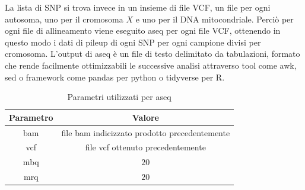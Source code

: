  La lista di SNP si trova invece in un insieme di file VCF, un file per ogni autosoma, uno per il cromosoma $X$ e uno per il DNA mitocondriale.
  Perci\`o per ogni file di allineamento viene eseguito aseq per ogni file VCF, ottenendo in questo modo i dati di pileup di ogni SNP per ogni campione divisi per cromosoma.
  L'output di aseq \`e un file di testo delimitato da tabulazioni, formato che rende facilmente ottimizzabili le successive analisi attraverso tool come awk, sed o framework come pandas per python o tidyverse per R.
  \begin{table}[H]
        \begin{tabular}{|c|c|}
                \hline
                Parametro & Valore\\
                \hline
                bam & file bam indicizzato prodotto precedentemente\\
                \hline
                vcf & file vcf ottenuto precedentemente\\
                \hline
                mbq & $20$\\
                \hline
                mrq & $20$\\
                \hline
         \end{tabular}
         \centering
         \caption{Parametri utilizzati per aseq}
   \end{table}
